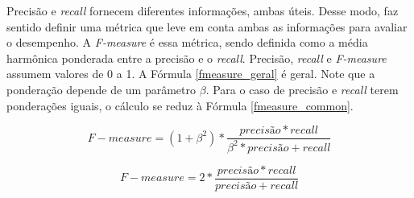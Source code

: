 \par Precisão e \textit{recall} fornecem diferentes informações, ambas 
úteis. Desse modo, faz sentido definir uma métrica que leve em conta ambas as
informações para avaliar o desempenho. A \textit{F-measure} é essa métrica, sendo
definida como a média harmônica ponderada entre a precisão e o \textit{recall}. Precisão,
\textit{recall} e \textit{F-measure} assumem valores de 0 a 1. A Fórmula
\ref{fmeasure_geral} é geral. Note que a ponderação depende de um parâmetro $\beta$.
Para o caso de precisão e \textit{recall} terem ponderações iguais, o cálculo se reduz à
Fórmula \ref{fmeasure_common}.

\begin{equation}
    F-measure = (1 + \beta^2 ) * \frac{precisão * recall}{\beta^2 * precisão + recall}
    \label{fmeasure_geral}
\end{equation}

\begin{equation}
    F-measure = 2 * \frac{precisão * recall}{precisão + recall}
    \label{fmeasure_common}
\end{equation}
